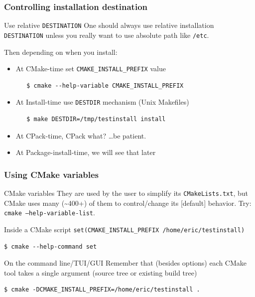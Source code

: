 \documentclass[compress,slidestop,table,usepdftitle=false
              ]
               {beamer}
\newcommand{\fname}[1]{\texttt{#1}}
\begin{document}
\begin{frame}[fragile]
\frametitle{Controlling installation destination}
\begin{alertblock}{Use relative \lstinline!DESTINATION!}
One should always use relative installation \lstinline!DESTINATION!
unless you really want to use absolute path like \fname{/etc}.
\end{alertblock}
Then depending on when you install:
\begin{itemize}
\pause
\item At \textcolor{cmaketimec}{CMake-time} set \lstinline!CMAKE_INSTALL_PREFIX! value

     \begin{Verbatim}
   $ cmake --help-variable CMAKE_INSTALL_PREFIX
     \end{Verbatim}
\pause
\item At \textcolor{installtimec}{Install-time} use \fname{DESTDIR} mechanism (Unix Makefiles)

      \begin{Verbatim}
   $ make DESTDIR=/tmp/testinstall install
      \end{Verbatim}
\pause
\item At \textcolor{cpacktimec}{CPack-time}, CPack what? \ldots be patient.
\item At \textcolor{installtimec}{Package-install-time}, we will see that later
\end{itemize}
\end{frame}


\begin{frame}[fragile]
\frametitle{Using CMake variables}
\begin{block}{CMake variables}
They are used by the user to simplify its \fname{CMakeLists.txt},
but CMake uses many (\textasciitilde 400+) of them to control/change its [default] behavior.
Try: \texttt{cmake --help-variable-list}.
\end{block}
\begin{block}{Inside a CMake script}
\lstinline!set(CMAKE_INSTALL_PREFIX /home/eric/testinstall)!
\begin{Verbatim}
$ cmake --help-command set
\end{Verbatim}
\end{block}
\begin{block}{On the command line/TUI/GUI}
Remember that (besides options) each CMake tool takes a single argument
(source tree or \alert{existing} build tree)
\begin{Verbatim}[fontsize=\scriptsize]
$ cmake -DCMAKE_INSTALL_PREFIX=/home/eric/testinstall .
\end{Verbatim}
\end{block}
\end{frame}
\end{document}
